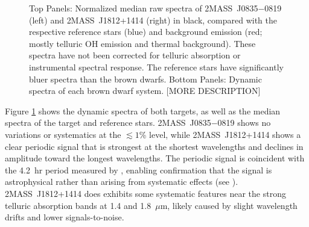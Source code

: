 \documentclass[twocolumn]{aastex6}
\newcommand{\sha}{2MASS~J0835$-$0819}
\newcommand{\shb}{2MASS~J1812+1414}
\begin{document}
\begin{figure}[!t]
\centering
{}
	\caption{Top Panels: Normalized median raw spectra of {\sha} (left) and {\shb} (right) in black, compared with the respective reference stars (blue) and background emission (red; mostly telluric OH emission and thermal background). These spectra have not been corrected for telluric absorption or instrumental spectral response. The reference stars have significantly bluer spectra than the brown dwarfs. Bottom Panels: Dynamic spectra of each brown dwarf system. [MORE DESCRIPTION]}
	\label{fig:specphot}
	\vspace{0.1in}
\end{figure} 

Figure \ref{fig:specphot} shows the dynamic spectra of both targets, as well as the median spectra of the target and reference stars.
{\sha} shows no variations or systematics at the $\lesssim1$\% level, while {\shb} shows a clear periodic signal that is strongest at the shortest wavelengths and declines in amplitude toward the longest wavelengths. The periodic signal is coincident with the 4.2~hr period measured by \citet{2015ApJ...799..154M}, enabling confirmation that the signal is astrophysical rather than arising from systematic effects (see \citealt{2016ApJ...826..156S}).
{\shb} does exhibits some systematic features near the strong telluric absorption bands at 1.4 and 1.8~$\mu$m, likely caused by slight wavelength drifts and lower signals-to-noise.
\end{document}
